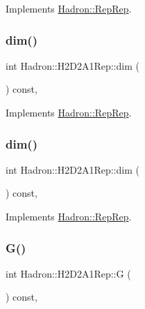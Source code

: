 Implements \mbox{\hyperlink{structHadron_1_1RepRep_a92c8802e5ed7afd7da43ccfd5b7cd92b}{Hadron\+::\+Rep\+Rep}}.

\mbox{\label{structHadron_1_1H2D2A1Rep_aad683d8986031b8f6a2b9e5ab83a5b17}} 
\subsubsection{\texorpdfstring{dim()}{dim()}\hspace{0.1cm}{\footnotesize\ttfamily [2/3]}}
{\footnotesize\ttfamily int Hadron\+::\+H2\+D2\+A1\+Rep\+::dim (\begin{DoxyParamCaption}{ }\end{DoxyParamCaption}) const\hspace{0.3cm}{\ttfamily [inline]}, {\ttfamily [virtual]}}



Implements \mbox{\hyperlink{structHadron_1_1RepRep_a92c8802e5ed7afd7da43ccfd5b7cd92b}{Hadron\+::\+Rep\+Rep}}.

\mbox{\label{structHadron_1_1H2D2A1Rep_aad683d8986031b8f6a2b9e5ab83a5b17}} 
\subsubsection{\texorpdfstring{dim()}{dim()}\hspace{0.1cm}{\footnotesize\ttfamily [3/3]}}
{\footnotesize\ttfamily int Hadron\+::\+H2\+D2\+A1\+Rep\+::dim (\begin{DoxyParamCaption}{ }\end{DoxyParamCaption}) const\hspace{0.3cm}{\ttfamily [inline]}, {\ttfamily [virtual]}}



Implements \mbox{\hyperlink{structHadron_1_1RepRep_a92c8802e5ed7afd7da43ccfd5b7cd92b}{Hadron\+::\+Rep\+Rep}}.

\mbox{\label{structHadron_1_1H2D2A1Rep_a675ce644f7ba030fdfaf81297919a9c1}} 
\subsubsection{\texorpdfstring{G()}{G()}\hspace{0.1cm}{\footnotesize\ttfamily [1/2]}}
{\footnotesize\ttfamily int Hadron\+::\+H2\+D2\+A1\+Rep\+::G (\begin{DoxyParamCaption}{ }\end{DoxyParamCaption}) const\hspace{0.3cm}{\ttfamily [inline]}, {\ttfamily [virtual]}}

